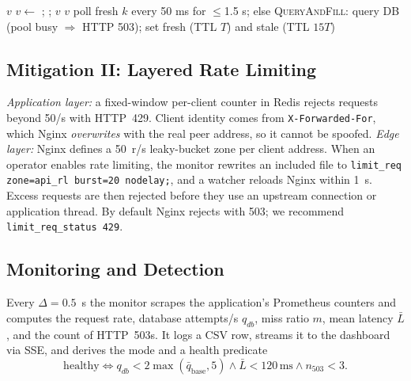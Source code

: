 \documentclass[journal]{IEEEtran}
\begin{document}
\begin{algorithm}[t]
\caption{Read path with single-flight locking and SWR}
\label{alg:read}
\small
\begin{algorithmic}[1]
 \Return $v$ \EndIf
{} \Return {} \EndIf
{} 
  \State $v\gets$ ; ; \Return $v$
\EndIf
{} \Return $v$ \EndIf
\State poll fresh $k$ every 50 ms for $\le$1.5 s; else \Return {}
\Statex \textsc{QueryAndFill}: query DB (pool busy $\Rightarrow$ HTTP 503);
set fresh (TTL $T$) and stale (TTL $15T$)
\end{algorithmic}
\end{algorithm}

\subsection{Mitigation II: Layered Rate Limiting}
\emph{Application layer:} a fixed-window per-client counter in Redis rejects requests
beyond 50/s with HTTP~429. Client identity comes from \texttt{X-Forwarded-For}, which
Nginx \emph{overwrites} with the real peer address, so it cannot be spoofed.
\emph{Edge layer:} Nginx defines a 50~r/s leaky-bucket zone per client address. When an
operator enables rate limiting, the monitor rewrites an included file to
\texttt{limit\_req zone=api\_rl burst=20 nodelay;}, and a watcher reloads Nginx within
1~s. Excess requests are then rejected before they use an upstream connection or
application thread. By default Nginx rejects with 503; we recommend
\texttt{limit\_req\_status 429}.

\subsection{Monitoring and Detection}
Every $\Delta=0.5$~s the monitor scrapes the application's Prometheus counters
\cite{brazil2018} and computes the request rate, database attempts/s $q_{db}$, miss
ratio $m$, mean latency $\bar L$, and the count of HTTP~503s. It logs a CSV row, streams
it to the dashboard via SSE, and derives the mode and a health predicate
\begin{equation}
\mathrm{healthy} \iff q_{db}<2\max(\bar q_{\mathrm{base}},5) \wedge \bar L<120\,\mathrm{ms} \wedge n_{503}<3 .
\label{eq:healthy}
\end{equation}
\end{document}
